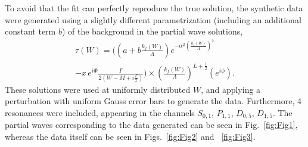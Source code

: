 \documentclass[aps, prd, twocolumn, showpacs, superscriptaddress,
preprintnumbers, nofootinbib]{revtex4-1}
\begin{document}
To avoid that the fit can perfectly reproduce the true solution, the synthetic data were generated using a slightly different parametrization (including an additional constant term $b$) of the background in the partial wave solutions,
\begin{equation}
\begin{gathered}
\tau(W)= \biggl((a+b\frac{k_f(W)}{\Lambda}) e^{-\alpha^2 (\frac{k_f(W)}{\Lambda})^2}\\
-x\,e^{i\Phi} \frac{\Gamma}{2(W-M+i \frac{\Gamma}{2})} \biggr)\times \left(\frac{k_f(W)}{\Lambda} \right) ^{L+\frac{1}{2}} \left( e^{i \phi} \right).
\end{gathered}
\end{equation}
These solutions were used at uniformly distributed $W$, and applying a perturbation with uniform Gauss error bars to generate the data. Furthermore, 4 resonances were included, appearing in the channels $S_{0,1}$, $P_{1,1}$, $D_{0,5}$, $D_{1,5}$. The partial waves corresponding to the data generated can be seen in  Fig.~\ref{fig:Fig1}, whereas the data itself can be seen in Figs.~\ref{fig:Fig2} and ~\ref{fig:Fig3}.
\end{document}
